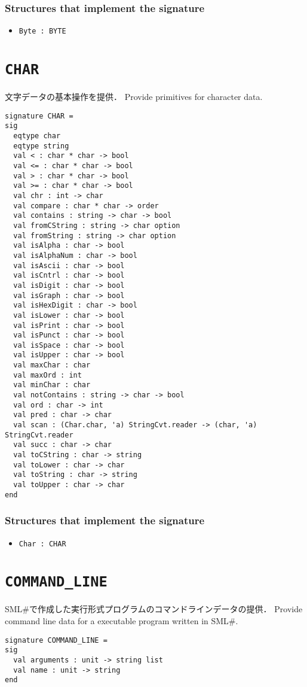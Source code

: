 \documentclass{jbook}
\newcommand{\txt}[2]{#2}
\newcommand{\smlsharp}{SML\#}
\newcommand{\code}[1]{\mbox{\large\tt #1}}
\newcommand{\signature}[2]{
\section{{\tt #1}}\label{section:reference:#2}
}
\newcommand{\Structure}{\subsubsection*{\txt{シグネチャを実装するストラクチャ}{Structures that implement the signature}}}
\begin{document}
\Structure
\begin{itemize}
\item \code{Byte : BYTE}
\end{itemize}

\signature{CHAR}{CHAR}
\ifjp%
	文字データの基本操作を提供．
\else%
	Provide primitives for character data.
\fi%

\begin{verbatim}
signature CHAR =
sig
  eqtype char
  eqtype string
  val < : char * char -> bool
  val <= : char * char -> bool
  val > : char * char -> bool
  val >= : char * char -> bool
  val chr : int -> char
  val compare : char * char -> order
  val contains : string -> char -> bool
  val fromCString : string -> char option
  val fromString : string -> char option
  val isAlpha : char -> bool
  val isAlphaNum : char -> bool
  val isAscii : char -> bool
  val isCntrl : char -> bool
  val isDigit : char -> bool
  val isGraph : char -> bool
  val isHexDigit : char -> bool
  val isLower : char -> bool
  val isPrint : char -> bool
  val isPunct : char -> bool
  val isSpace : char -> bool
  val isUpper : char -> bool
  val maxChar : char
  val maxOrd : int
  val minChar : char
  val notContains : string -> char -> bool
  val ord : char -> int
  val pred : char -> char
  val scan : (Char.char, 'a) StringCvt.reader -> (char, 'a) StringCvt.reader
  val succ : char -> char
  val toCString : char -> string
  val toLower : char -> char
  val toString : char -> string
  val toUpper : char -> char
end
\end{verbatim}

\Structure
\begin{itemize}
\item \code{Char : CHAR}
\end{itemize}


\signature{COMMAND\_LINE}{COMMANDLINE}
\ifjp%
	\smlsharp{}で作成した実行形式プログラムのコマンドラインデータの提供．
\else%
	Provide command line data for a executable program written in \smlsharp.
\fi%
\begin{verbatim}
signature COMMAND_LINE =
sig
  val arguments : unit -> string list
  val name : unit -> string
end
\end{verbatim}
\end{document}
